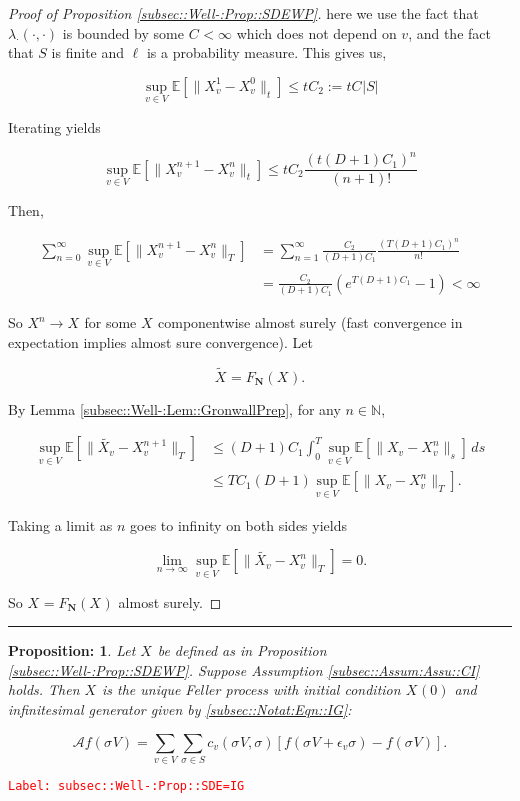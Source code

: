 \documentclass[12pt]{article}
\newcommand{\mb}{\mathbb}
\newcommand{\mc}{\mathcal}
\newcommand{\ra}{\rightarrow}
\newcommand{\ep}{\epsilon}
\newcommand{\tr}{\textcolor{red}}
\newcommand{\labe}[1]{\tr{\texttt{Label: #1}}}
\newcommand{\lin}{\rule{\linewidth}{0.4 pt}}
\newcommand{\ex}[1]{\mb{E}\left[#1\right]}			%
\newcommand{\defeq}{:=}								%
\renewcommand{\v}{v}							%
\renewcommand{\S}{S}							%
\newcommand{\s}{\sigma}							%
\newcommand{\sv}[1]{\s^{#1}}					%
\newcommand{\ev}[1]{\ep_{#1}}					%
\newcommand{\T}{T}								%
\renewcommand{\t}{t}							%
\newcommand{\degr}{D}								%
\newcommand{\poisses}{\mathbf{N}}				%
\newcommand{\IG}{\mc{A}}						%
\newcommand{\V}{V}									%
\renewcommand{\tt}{s}								%
\newcommand{\numb}{n}								%
\newcommand{\XState}[1]{\S^{#1}}				%
\newcommand{\rxvt}[2]{X_{#1}{(#2)}}					%
\newcommand{\rxvts}[2]{X_{#1}{#2}}					%
\newcommand{\rxvtsn}[3]{X_{#1}^{#3}{#2}}			%
\newcommand{\IGr}[1]{c_{#1}}						%
\newcommand{\rate}[1]{\lambda_{#1}}					%
\newcommand{\const}[1]{C_{#1}}						%
\newcommand{\Sm}{\ell}								%
\newcommand{\alt}{\widetilde}						%
\newtheorem{prop}[thms]{Proposition: }
\begin{document}
\begin{proof}[Proof of Proposition \ref{subsec::Well-:Prop::SDEWP}]
here we use the fact that \(\rate{\cdot}(\cdot,\cdot)\) is bounded by some \(\const{} < \infty\) which does not depend on \(\v\), and the fact that \(\S\) is finite and \(\Sm\) is a probability measure. This gives us,

\[\sup_{\v \in \V}\ex{\|\rxvtsn{\v}{}{1} - \rxvtsn{\v}{}{0}\|_\t} \leq \t\const{2} \defeq \t\const{}|\S|\]

Iterating yields

\[\sup_{\v \in \V} \ex{\|\rxvtsn{\v}{}{\numb+1} - \rxvtsn{\v}{}{\numb}\|_\t} \leq \t\const{2}\frac{(\t(\degr+1)\const{1})^\numb}{(\numb+1)!}\]

Then,

\begin{align*}
\sum_{\numb=0}^\infty \sup_{\v \in \V} \ex{\|\rxvtsn{\v}{}{\numb+1} - \rxvtsn{\v}{}{\numb}\|_\T} &= \sum_{\numb=1}^\infty \frac{\const{2}}{(\degr+1)\const{1}}\frac{(\T(\degr+1)\const{1})^{\numb}}{\numb !}\\
& = \frac{\const{2}}{(\degr+1)\const{1}}(e^{\T(\degr+1)\const{1}} - 1) < \infty
\end{align*}


So \(\rxvtsn{}{}{\numb} \ra \rxvts{}{}\) for some \(\rxvts{}{}\) componentwise almost surely (fast convergence in expectation implies almost sure convergence). Let 

\[\alt{\rxvts{}{}} = F_\poisses(\rxvts{}{}).\]

By Lemma \ref{subsec::Well-:Lem::GronwallPrep}, for any \(\numb\in\mb{N}\),

\begin{align*}
\sup_{\v \in \V} \ex{\|\alt{\rxvts{\v}{}} - \rxvtsn{\v}{}{\numb+1}\|_\T} &\leq (\degr+1)\const{1}\int_0^\T \sup_{\v \in \V}\ex{\|\rxvts{\v}{} - \rxvtsn{\v}{}{\numb}\|_\tt}\,d\tt \\
&\leq \T\const{1}(\degr+1)\sup_{\v\in \V} \ex{\|\rxvts{\v}{} - \rxvtsn{\v}{}{\numb}\|_\T}.
\end{align*}

Taking a limit as \(\numb\) goes to infinity on both sides yields

\[\lim_{\numb\ra\infty} \sup_{\v \in \V} \ex{\|\alt{\rxvts{\v}{}} - \rxvtsn{\v}{}{\numb}\|_\T} = 0.\]

So \(\rxvts{}{}= F_\poisses(\rxvts{}{})\) almost surely.
\end{proof}

\lin

\begin{prop}
Let \(\rxvts{}{}\) be defined as in Proposition \ref{subsec::Well-:Prop::SDEWP}. Suppose Assumption \ref{subsec::Assum:Assu::CI} holds. Then \(\rxvts{}{}\) is the unique Feller process with initial condition \(\rxvt{}{0}\) and infinitesimal generator given by \eqref{subsec::Notat:Eqn::IG}:

\[\IG f(\sv{}{\V}) = \sum_{\v\in \V}\sum_{\s \in \S} \IGr{\v}(\sv{}{\V},\s)[f(\sv{}{\V} + \ev{\v}\s) - f(\sv{}{\V})].\]
\label{subsec::Well-:Prop::SDE=IG}
\end{prop}
\labe{subsec::Well-:Prop::SDE=IG}
\end{document}
